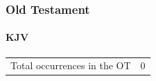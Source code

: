 	\subsubsection{Old Testament} %
		\label{HSOP-OT}
	
		\paragraph{KJV}
			\label{HSOP-OT-KJV}
	
			\begin{tabular}{ll}
				Total occurrences in the OT & 0
			\end{tabular}
			
			
		
			
				
			
